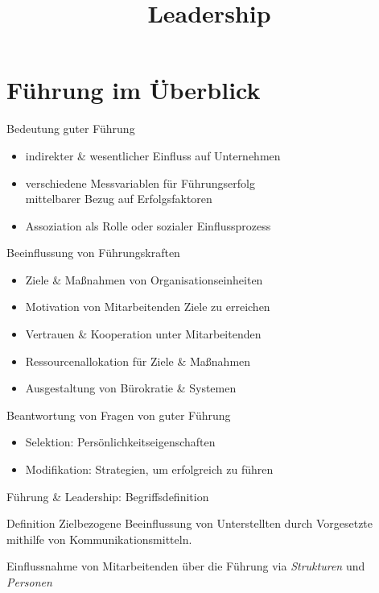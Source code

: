 \documentclass{cheatsheet}
\title{Leadership}
\begin{document}
    \section{Führung im Überblick}
    \begin{sectionbox}{Bedeutung guter Führung}
        \begin{itemize}
            \item indirekter \& wesentlicher Einfluss auf Unternehmen
            \item verschiedene Messvariablen für Führungserfolg\\
            \ra mittelbarer Bezug auf Erfolgsfaktoren
            \item Assoziation als Rolle oder sozialer Einflussprozess
        \end{itemize}
        \begin{hintbox}{Beeinflussung von Führungskraften}
            \begin{itemize}
                \item Ziele \& Maßnahmen von Organisationseinheiten
                \item  Motivation von Mitarbeitenden Ziele zu erreichen
                \item Vertrauen \& Kooperation unter Mitarbeitenden
                \item Ressourcenallokation für Ziele \& Maßnahmen
                \item Ausgestaltung von Bürokratie \& Systemen
            \end{itemize}
        \end{hintbox}
        \begin{warningbox}{Beantwortung von Fragen von guter Führung}
            \begin{itemize}
                \item Selektion: Persönlichkeitseigenschaften
                \item Modifikation: Strategien, um erfolgreich zu führen
            \end{itemize}
        \end{warningbox}    
    \end{sectionbox}
    \begin{sectionbox}{Führung \& Leadership: Begriffsdefinition}
        \begin{warningbox}{Definition}
            Zielbezogene Beeinflussung von Unterstellten durch Vorgesetzte mithilfe von Kommunikationsmitteln.
        \end{warningbox}
        \begin{hintbox}{Einflussnahme von Mitarbeitenden über die Führung}
            via \emph{Strukturen} und \emph{Personen}
        \end{hintbox}
    \end{sectionbox}
\end{document}

